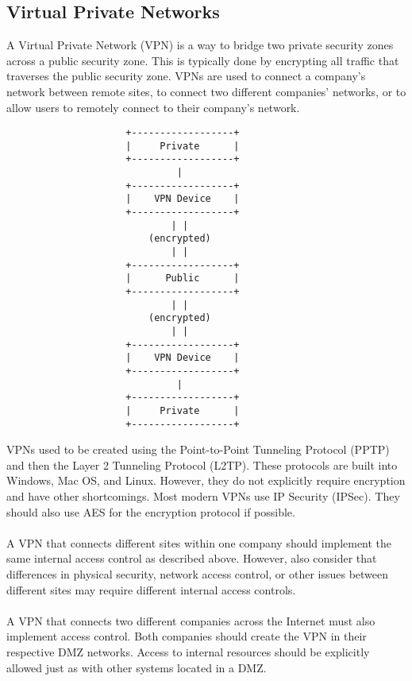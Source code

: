 \subsection{Virtual Private Networks}\label{subsec:"Virtual Private Networks"}
A Virtual Private Network (VPN) is a way to bridge two private security zones across a public security zone. This is typically done by encrypting all traffic that traverses the public security zone. VPNs are used to connect a company's network between remote sites, to connect two different companies' networks, or to allow users to remotely connect to their company's network.
\begin{verbatim}
                     +------------------+
                     |     Private      |
                     +------------------+
                              |
                     +------------------+
                     |    VPN Device    |
                     +------------------+
                             | |
                         (encrypted)
                             | |
                     +------------------+
                     |      Public      |
                     +------------------+ 
                             | |
                         (encrypted)
                             | |
                     +------------------+
                     |    VPN Device    |
                     +------------------+
                              |             
                     +------------------+ 
                     |     Private      | 
                     +------------------+ 
\end{verbatim}
VPNs used to be created using the Point-to-Point Tunneling Protocol (PPTP) and then the Layer 2 Tunneling Protocol (L2TP). These protocols are built into Windows, Mac OS, and Linux. However, they do not explicitly require encryption and have other shortcomings. Most modern VPNs use IP Security (IPSec). They should also use AES for the encryption protocol if possible.\\\\
A VPN that connects different sites within one company should implement the same internal access control as described above. However, also consider that differences in physical security, network access control, or other issues between different sites may require different internal access controls.\\\\
A VPN that connects two different companies across the Internet must also implement access control. Both companies should create the VPN in their respective DMZ networks. Access to internal resources should be explicitly allowed just as with other systems located in a DMZ.
